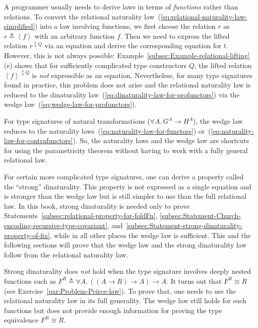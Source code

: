 A programmer usually needs to derive laws in terms of \emph{functions}
rather than relations. To convert the relational naturality law~(\ref{eq:relational-naturality-law-simplified})
into a law involving functions, we first choose the relation $r$
as $r\triangleq\left<f\right>$ with an arbitrary function $f$. Then
we need to express the lifted relation $r^{\updownarrow Q}$ via an
equation and derive the corresponding equation for $t$. However,
this is not always possible: Example~\ref{subsec:Example-relational-lifting}(e)
shows that for sufficiently complicated type constructors $Q$, the
lifted relation $\left<f\right>^{\updownarrow Q}$ is \emph{not} expressible
as an equation. Nevertheless, for many type signatures found in practice,
this problem does not arise and the relational naturality law is reduced
to the dinaturality law~(\ref{eq:dinaturality-law-for-profunctors})
via the wedge law~(\ref{eq:wedge-law-for-profunctors}). 

For type signatures of natural transformations ($\forall A.\,G^{A}\rightarrow H^{A}$),
the wedge law reduces to the naturality laws~(\ref{eq:naturality-law-for-functors})
or~(\ref{eq:naturality-law-for-contrafunctors}). So, the naturality
laws and the wedge law are shortcuts for using the parametricity theorem
without having to work with a fully general relational law.

For certain more complicated type signatures, one can derive a property
called the \textsf{``}strong\textsf{''} dinaturality. This property is not expressed
as a single equation and is stronger than the wedge law but is still
simpler to use than the full relational law. In this book, strong
dinaturality is needed only to prove Statements~\ref{subsec:relational-property-for-foldFn},
\ref{subsec:Statement-Church-encoding-recursive-type-covariant},
and~\ref{subsec:Statement-strong-dinaturality-property-of-fix},
while in all other places the wedge law is sufficient. This and the
following sections will prove that the wedge law and the strong dinaturality
law follow from the relational naturality law.

Strong dinaturality does \emph{not} hold when the type signature involves
deeply nested functions such as $F^{R}\triangleq\forall A.\,(\left(A\rightarrow R\right)\rightarrow A)\rightarrow A$.
It turns out that $F^{R}\cong R$ (see Exercise~\ref{par:Problem-Peirce-law}).
To prove that, one needs to use the relational naturality law in its
full generality. The wedge law still holds for such functions but
does not provide enough information for proving the type equivalence
$F^{R}\cong R$. 

